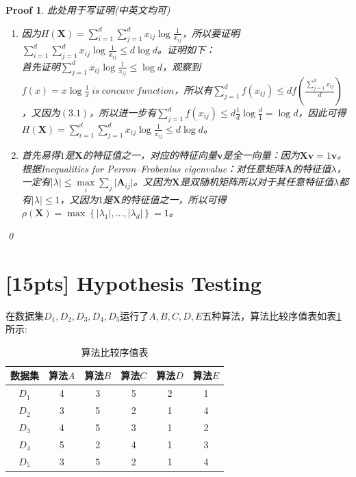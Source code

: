 \documentclass[a4paper,UTF8]{article}
\numberwithin{equation}{section}
\newtheorem*{myProof}{Proof}
\begin{document}
\begin{myProof}
此处用于写证明(中英文均可)

\begin{enumerate}
\item 
因为$H(\mathbf{X})=\sum_{i=1}^{d}\sum_{j=1}^{d}x_{ij}\log \frac{1}{x_{ij}}$，所以要证明$\sum_{i=1}^{d}\sum_{j=1}^{d}x_{ij}\log \frac{1}{x_{ij}} \leq d\log d$。证明如下：\\
首先证明$\sum_{j=1}^{d}x_{ij}\log\frac{1}{x_{ij}}\leq \log d$，观察到$f(x) = x\log \frac{1}{x}\ is\ concave\ function$，所以有$\sum_{j=1}^{d}f(x_{ij}) \leq df(\frac{\sum_{j=1}^{d}x_{ij}}{d})$，又因为$(3.1)$，所以进一步有$\sum_{j=1}^{d}f(x_{ij}) \leq d\frac{1}{d}\log \frac{d}{1} = \log d$，因此可得$H(\mathbf{X})=\sum_{i=1}^{d}\sum_{j=1}^{d}x_{ij}\log \frac{1}{x_{ij}} \leq d\log d$。

\item 
首先易得$1$是$\mathbf{X}$的特征值之一，对应的特征向量$\mathbf{v}$是全一向量：因为$\mathbf{X}\mathbf{v} = 1\mathbf{v}$。\\
根据Inequalities for Perron–Frobenius eigenvalue：对任意矩阵$\mathbf{A}$的特征值$\lambda$，一定有$\vert\lambda\vert\leq\max\limits_{i}\sum_{j}\vert\mathbf{A}_{ij}\vert$。又因为$\mathbf{X}$是双随机矩阵所以对于其任意特征值$\lambda$都有$\vert\lambda\vert\leq 1$，又因为$1$是$\mathbf{X}$的特征值之一，所以可得$\rho(\mathbf{X}) = \max\left\{|\lambda_1|,...,|\lambda_d|\right\} = 1$。
\end{enumerate}

\qed
\end{myProof}
\newpage
\section{[15pts] Hypothesis Testing} 
在数据集$D_1,D_2,D_3,D_4,D_5$运行了$A,B,C,D,E$五种算法，算法比较序值表如表\ref{table:ranking}所示:
\begin{table}[h]
\centering
\caption{算法比较序值表} \vspace{2mm}
\label{table:ranking}
\begin{tabular}{c|c c c c c}\hline
数据集 		& 算法$A$  	&算法$B$  	& 算法$C$ 	& 算法$D$  	&算法$E$ 	\\ \hline
$D_1$ 		& 4 		&  3  		& 5  		&  2 		& 1			\\
$D_2$ 		& 3 		&  5  		& 2  		&  1 		& 4			\\
$D_3$ 		& 4 		&  5  		& 3  		&  1 		& 2			\\ 
$D_4$ 		& 5 		&  2  		& 4  		&  1 		& 3			\\ 
$D_5$ 		& 3 		&  5  		& 2  		&  1 		& 4			\\ \hline
\end{tabular}
\end{table}
\end{document}
